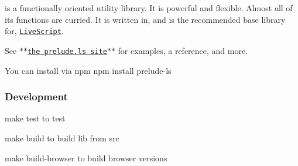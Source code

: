 is a functionally oriented utility library. It is powerful and flexible. Almost all of its functions are curried. It is written in, and is the recommended base library for, \href{http://livescript.net}{\tt Live\+Script}.

See $\ast$$\ast$\href{http://preludels.com}{\tt the prelude.\+ls site}$\ast$$\ast$ for examples, a reference, and more.

You can install via npm {\ttfamily npm install prelude-\/ls}

\subsubsection*{Development}

{\ttfamily make test} to test

{\ttfamily make build} to build {\ttfamily lib} from {\ttfamily src}

{\ttfamily make build-\/browser} to build browser versions 